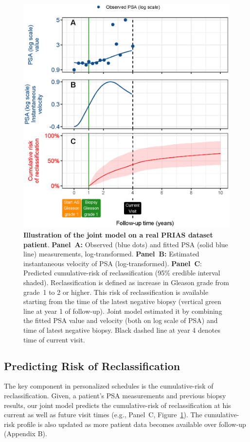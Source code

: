 \begin{figure}
\centerline{\includegraphics[width=\columnwidth]{images/jmExplanationPlot_113.eps}}
\caption{\textbf{Illustration of the joint model on a real PRIAS dataset patient}. \textbf{Panel~A:} Observed (blue dots) and fitted PSA (solid blue line) measurements, log-transformed. \textbf{Panel~B:} Estimated instantaneous velocity of PSA (log-transformed). \textbf{Panel~C}: Predicted cumulative-risk of reclassification (95\% credible interval shaded). Reclassification is defined as increase in Gleason grade \citep{epsteinGG2014} from grade~1 to 2 or higher. This risk of reclassification is available starting from the time of the latest negative biopsy (vertical green line at year 1 of follow-up). Joint model estimated it by combining the fitted PSA value and velocity (both on log scale of PSA) and time of latest negative biopsy. Black dashed line at year 4 denotes time of current visit.}
\label{fig:jmExplanationPlot_113}
\end{figure}

\subsection{Predicting Risk of Reclassification}
The key component in personalized schedules is the cumulative-risk of reclassification. Given, a patient's PSA measurements and previous biopsy results, our joint model predicts the cumulative-risk of reclassification at his current as well as future visit times (e.g., Panel~C, Figure~\ref{fig:jmExplanationPlot_113}). The cumulative-risk profile is also updated as more patient data becomes available over follow-up (Appendix B).

